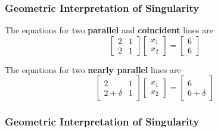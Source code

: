\documentclass[10pt]{beamer}
\begin{document}
\begin{frame}
\frametitle{Geometric Interpretation of Singularity}

The equations for two \textbf{parallel} and \textbf{coincident} lines are
\begin{equation*}
    \begin{bmatrix} 2 & 1 \\ 2 & 1 \end{bmatrix}
    \begin{bmatrix} x_1 \\ x_2 \end{bmatrix}
    =
    \begin{bmatrix} 6 \\ 6 \end{bmatrix}
\end{equation*}

The equations for two \textbf{nearly parallel} lines are
\begin{equation*}
    \begin{bmatrix} 2 & 1 \\ 2+\delta & 1 \end{bmatrix}
    \begin{bmatrix} x_1 \\ x_2 \end{bmatrix}
    =
    \begin{bmatrix} 6 \\ 6+\delta \end{bmatrix}
\end{equation*}

\end{frame}
\begin{frame}
\frametitle{Geometric Interpretation of Singularity}

\begin{center}
\end{center}


\end{frame}
\end{document}
